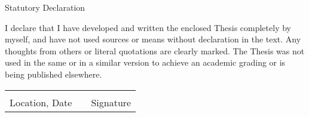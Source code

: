 


{
    
    
    \begin{minipage}[c][\textheight][c]{\textwidth}
        \begin{center}
            \huge{Statutory Declaration}
        \end{center}
        
        \vspace*{1.5cm}
        
        I declare that I have developed and written the enclosed Thesis completely by myself, and have not used sources or means without declaration in the text. Any thoughts from others or literal quotations are clearly marked. The Thesis was not used in the same or in a similar version to achieve an academic grading or is being published elsewhere.
        
        \vspace*{2cm}
        
        \begin{center}
            \begin{tabular}{cp{2.5cm}c}
                \hspace{5cm}   && \hspace{5cm} \\
                \cline{1-1}\cline{3-3}
                \addlinespace
                Location, Date && Signature
            \end{tabular}
        \end{center}
    \end{minipage}
    

}


\cleardoublepage



